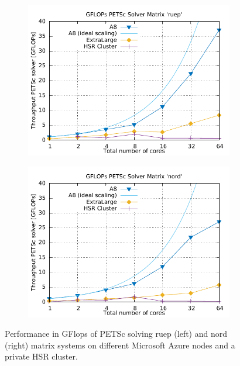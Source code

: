 \documentclass[3p,times]{elsarticle}
\begin{document}
\begin{figure}
\centering
\begin{subfigure}{.5\textwidth}
  \centering
	\includegraphics[width=\linewidth]{gplt-gflops-ruep}  
  \label{fig:ruepel}
\end{subfigure}%
\begin{subfigure}{.5\textwidth}
  \centering
  \includegraphics[width=\linewidth]{gplt-gflops-nord}
  \label{fig:nord}
\end{subfigure}
\caption{Performance in GFlops of PETSc solving ruep (left) and nord (right) matrix systems on different Microsoft Azure nodes and a private HSR cluster. }
\label{fig:test}
\end{figure}
\end{document}
